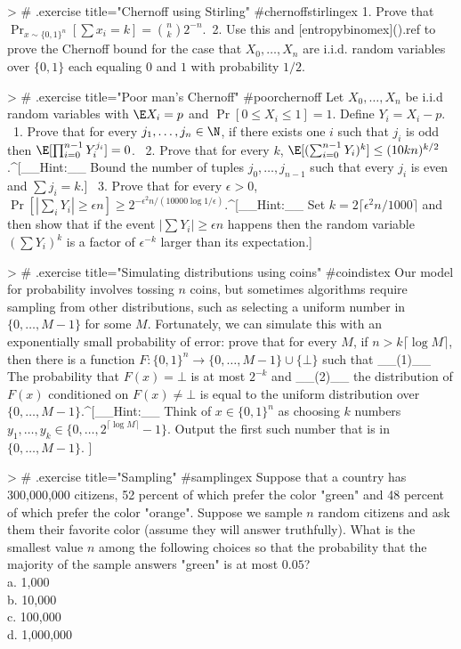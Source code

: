 > # {.exercise title="Chernoff using Stirling" #chernoffstirlingex}
1. Prove that $\Pr_{x\sim \{0,1\}^n}[ \sum x_i = k ] = \binom{n}{k}2^{-n}$.\
2. Use this and [entropybinomex](){.ref} to prove the Chernoff bound for the case that $X_0,\ldots,X_n$ are i.i.d. random variables over $\{0,1\}$ each equaling $0$ and $1$ with probability $1/2$.

> # {.exercise title="Poor man's Chernoff" #poorchernoff}
Let $X_0,\ldots,X_n$ be i.i.d random variables with $\E X_i = p$ and $\Pr [ 0 \leq X_i \leq 1 ]=1$.
Define $Y_i = X_i - p$.  \
1. Prove that for every $j_1,\ldots,j_n \in \N$, if there exists one $i$ such that $j_i$ is odd then $\E [\prod_{i=0}^{n-1} Y_i^{j_i}] = 0$. \
2. Prove that for every $k$, $\E[ (\sum_{i=0}^{n-1} Y_i)^k ] \leq (10kn)^{k/2}$.^[__Hint:__ Bound the number of tuples $j_0,\ldots,j_{n-1}$ such that every $j_i$ is even and $\sum j_i = k$.] \
3. Prove that for every $\epsilon>0$, $\Pr[ |\sum_i Y_i| \geq \epsilon n ] \geq 2^{-\epsilon^2 n / (10000\log 1/\epsilon)}$.^[__Hint:__ Set $k=2\lceil \epsilon^2 n /1000 \rceil$ and then show that if the event $|\sum Y_i | \geq \epsilon n$ happens then the random variable $(\sum Y_i)^k$ is a factor of $\epsilon^{-k}$ larger than its expectation.]



> # {.exercise title="Simulating distributions using coins" #coindistex}
Our model for probability involves tossing $n$ coins, but sometimes algorithms require sampling from other distributions, such as selecting a uniform number in $\{0,\ldots,M-1\}$ for some $M$.
Fortunately,  we can simulate this with an exponentially small probability of error: prove that for every $M$, if $n>k\lceil \log M \rceil$, then there is a function $F:\{0,1\}^n \rightarrow \{0,\ldots,M-1\} \cup \{ \bot \}$ such that __(1)__ The probability that $F(x)=\bot$ is at most $2^{-k}$ and __(2)__ the  distribution of $F(x)$ conditioned on $F(x) \neq \bot$ is equal to the uniform distribution over $\{0,\ldots,M-1\}$.^[__Hint:__ Think of $x\in \{0,1\}^n$ as choosing $k$ numbers $y_1,\ldots,y_k \in \{0,\ldots, 2^{\lceil \log M \rceil}-1 \}$. Output the first such number that is in $\{0,\ldots,M-1\}$. ]

> # {.exercise title="Sampling" #samplingex}
Suppose that a country has 300,000,000 citizens, 52 percent of which prefer the color "green" and 48 percent of which prefer the color "orange". Suppose we sample $n$ random citizens and ask them their favorite color (assume they will answer truthfully). What is the smallest value $n$ among the following  choices so that the probability that the majority of the sample answers "green" is at most $0.05$? \\
a. 1,000 \\
b. 10,000 \\
c. 100,000 \\
d. 1,000,000 \\

